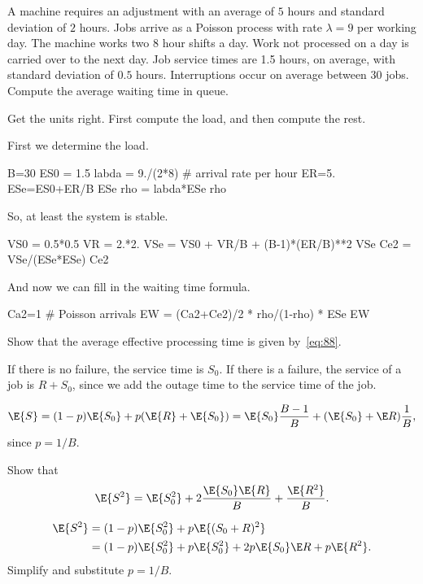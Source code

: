 \begin{exercise}
 A machine requires an adjustment with an average of $5$ hours and standard deviation of $2$ hours.
 Jobs arrive as a Poisson process with rate $\lambda=9$ per working day.
 The machine works two $8$ hour shifts a day.
 Work not processed on a day is carried over to the next day.
 Job service times are 1.5 hours, on average, with standard deviation of $0.5$ hours.
 Interruptions occur on average between $30$ jobs.
 Compute the average waiting time in queue.
\begin{hint}
 Get the units right. First compute the load, and then compute the rest.
\end{hint}
\begin{solution}
 First we determine the load. 
 \begin{pyconsole}
B=30
ES0 = 1.5
labda = 9./(2*8) # arrival rate per hour
ER=5.
ESe=ES0+ER/B
ESe
rho = labda*ESe
rho
 \end{pyconsole}
So, at least the system is stable.

\begin{pyconsole}
VS0 = 0.5*0.5
VR = 2.*2.
VSe = VS0 + VR/B + (B-1)*(ER/B)**2
VSe
Ce2 = VSe/(ESe*ESe)
Ce2
\end{pyconsole}

And now we can fill in the waiting time formula.
\begin{pyconsole}
Ca2=1 # Poisson arrivals
EW = (Ca2+Ce2)/2 * rho/(1-rho) * ESe
EW 
\end{pyconsole}
\end{solution}
\end{exercise}

\begin{exercise}
Show that the average effective processing time is given by~\cref{eq:88}. 
\begin{hint}
If there is no failure, the service time is $S_0$. If there is a failure, the service of a job is $R + S_0$, since we add the outage time to the service time of the job. 
\end{hint}
\begin{solution}
 \begin{equation*}
 \E{S} = (1-p)\E{S_0} + p (\E{R} + \E{S_0}) = \E{S_0} \frac{B-1}B + (\E{S_0} + \E R) \frac 1B,
 \end{equation*}
since $p=1/B$. 
\end{solution}
\end{exercise}


\begin{extra}
 Show that
 \begin{equation*}
 \E{S^2} = \E{S_0^2} + 2\frac{\E{S_0}\E{R}} B + \frac{\E{R^2}}B.
 \end{equation*}
\begin{solution}
 \begin{align*}
 \E{S^2} 
&= (1-p) \E{S_0^2} + p \E{(S_0+R)^2}\\
&= (1-p) \E{S_0^2} + p \E{S_0^2} + 2 p \E{S_0} \E R + p \E{R^2}. 
 \end{align*}
 Simplify and substitute $p=1/B$. 
\end{solution}
\end{extra}

